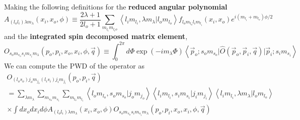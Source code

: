 \documentclass[onecolumn]{revtex4-2}
\begin{document}
Making the following definitions for the \textbf{reduced angular polynomial}
\begin{equation}\label{def:red-ang}
    A_{(l_o l_i)\lambda m_\lambda}(x_i, x_o, \phi)
    \equiv
    \frac{2 \lambda +1}{2 l_o + 1}
    \sum_{m_{l_i}m_{l_io}}
    \left\langle
        l_i m_{l_i}, \lambda m_{\lambda} \big\vert l_o m_{l_o}
    \right\rangle
    f_{l_o m_{l_o} l_i m_{l_i}} (x_i, x_o)
    e^{i (m_{l_i} +  m_{l_o}) \phi/2}
\end{equation}
and the \textbf{integrated spin decomposed matrix element},
\begin{equation}
    \label{def:integrated-spin-pwd}
    O_{s_o m_{s_o} s_i m_{s_i} m_\lambda}(p_o, p_i, x_o, x_i, \phi, \vec q)
    \equiv
    \int_{0}^{2\pi} d \Phi \exp\left(-i m_\lambda \Phi\right)
    \left\langle
        \vec p_o; s_o m_{s_o}
        \big\vert
        \hat O(\vec p_o, \vec p_i, \vec q)
        \big\vert
        \vec p_i; s_i m_{s_i}
    \right\rangle
\end{equation}
We can compute the PWD of the operator as
\begin{multline}\label{def:pwd}
    O_{(l_o s_o)j_o m_{j_o} (l_i s_i)j_i m_{j_i}}(p_o, p_i, \vec{q})
    \\ =
    \sum\limits_{\lambda m_\lambda}
    \sum\limits_{m_{s_o} m_{s_i}}
    \sum\limits_{m_{l_o} m_{l_i}}
    \left\langle
        l_o m_{l_o}, s_o m_{s_o} \big\vert j_o m_{j_o}
    \right\rangle
    \left\langle
        l_i m_{l_i}, s_i m_{s_i} \big\vert j_i m_{j_i}
    \right\rangle
    \left\langle
        l_i m_{l_i}, \lambda m_{\lambda} \big\vert l_o m_{l_o}
    \right\rangle
    \\ \times
    \int d x_o d x_i d \phi
    A_{(l_o l_i)\lambda m_\lambda}(x_i, x_o, \phi)
    O_{s_o m_{s_o} s_i m_{s_i} m_\lambda}(p_o, p_i, x_o, x_i, \phi, \vec q)
\end{multline}
\end{document}
